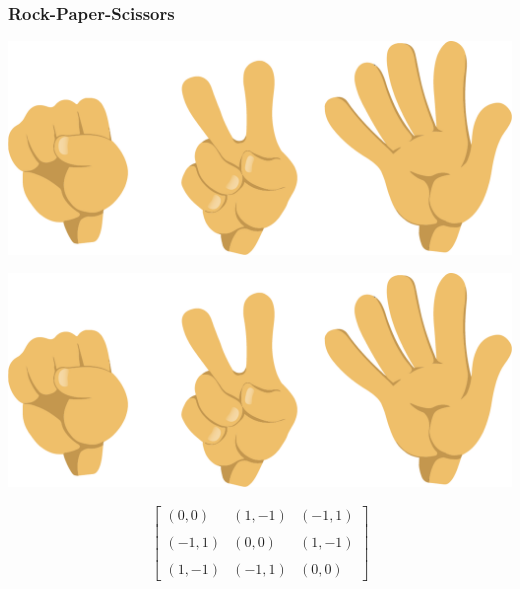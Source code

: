 \begin{frame}
    \frametitle{Rock-Paper-Scissors}
    
    \centering
    \hspace{1cm}
    \includegraphics[width=.3\textwidth]{Bin/rock-paper-scissors.png} \\
    
    \setlength{\columnsep}{0.1pt}
    \begin{multicols}{2}
        \includegraphics[width=.25\textwidth, angle=270]{Bin/rock-paper-scissors.png}

        \begin{equation*}
            \begin{bmatrix}
                (0,0) & (1,-1) & (-1,1) \\
                & & \\
                (-1,1) & (0,0) & (1,-1) \\
                & & \\
                (1,-1) & (-1,1) & (0,0)
            \end{bmatrix}
        \end{equation*}
    \end{multicols}

\end{frame}
